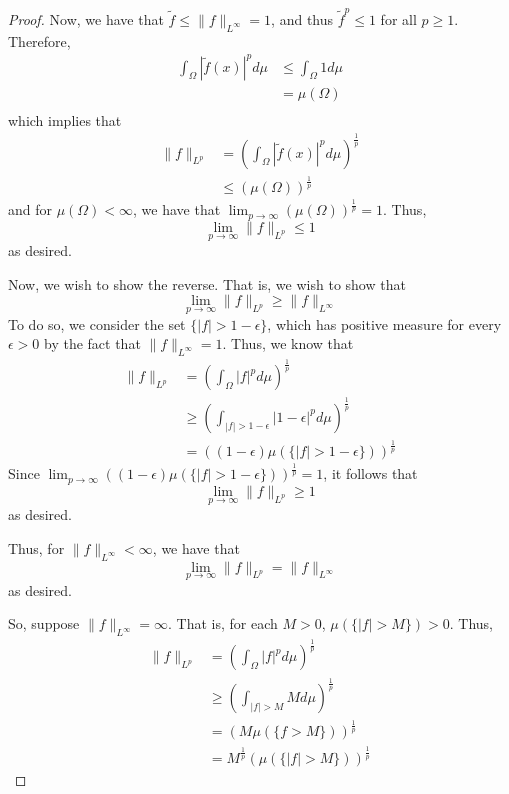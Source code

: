 \documentclass[fontsize=11pt]{scrartcl} %
\numberwithin{equation}{section} %
\numberwithin{figure}{section} %
\numberwithin{table}{section} %
\begin{document}
\begin{proof}
    Now, we have that $\tilde{f} \leq \|f\|_{L^{\infty}} = 1$, and thus
    $\tilde{f}^p\leq 1$ for all $p\geq 1$. Therefore,
    \[
        \begin{aligned}
            \int_{\Omega}|\tilde{f}(x)|^pd\mu &\leq \int_{\Omega}1d\mu\\
                                            &=\mu(\Omega)\\
        \end{aligned}
    \]
    which implies that
    \[
        \begin{aligned}
        \|f\|_{L^p} &=
        \left(\int_{\Omega}|\tilde{f}(x)|^pd\mu\right)^{\frac{1}{p}}\\
            &\leq (\mu(\Omega))^{\frac{1}{p}}
        \end{aligned}
    \]
    and for $\mu(\Omega)<\infty$, we have that
    $\lim_{p\to\infty}(\mu(\Omega))^{\frac{1}{p}} = 1$.
    Thus,
    \[
        \lim_{p\to\infty}\|f\|_{L^p} \leq 1
    \]
    as desired.

    Now, we wish to show the reverse. That is, we wish to show that
    \[
        \lim_{p\to\infty}\|f\|_{L^p} \geq \|f\|_{L^{\infty}}
    \]
    To do so, we consider the set $\{|f|>1-\epsilon\}$, which has positive
    measure for every $\epsilon>0$ by the fact that $\|f\|_{L^{\infty}} = 1$.
    Thus, we know that
    \[
        \begin{aligned}
            \|f\|_{L^p} &=\left(\int_{\Omega}|f|^pd\mu\right)^{\frac{1}{p}}\\
                        &\geq
                        \left(\int_{|f|>1-\epsilon}|1-\epsilon|^pd\mu\right)^{\frac{1}{p}}\\
                        &=((1-\epsilon)\mu(\{|f|>1-\epsilon\}))^{\frac{1}{p}}
        \end{aligned}
    \]
    Since $\lim_{p\to\infty}((1-\epsilon)\mu(\{|f|>1-\epsilon\}))^{\frac{1}{p}}
    = 1$, it follows that
    \[
        \lim_{p\to\infty}\|f\|_{L^p} \geq 1
    \]
    as desired.

    Thus, for $\|f\|_{L^{\infty}} < \infty$, we have that
    \[
        \lim_{p\to\infty}\|f\|_{L^p} = \|f\|_{L^{\infty}}
    \]
    as desired.

    So, suppose $\|f\|_{L^{\infty}} = \infty$. That is, for each $M>0$,
    $\mu(\{|f|>M\})>0$. Thus,
    \[
        \begin{aligned}
            \|f\|_{L^p} &= \left(\int_{\Omega}|f|^pd\mu\right)^{\frac{1}{p}}\\
                        &\geq \left(\int_{|f|>M}Md\mu\right)^{\frac{1}{p}}\\
                        &= \left(M\mu(\{f>M\})\right)^{\frac{1}{p}}\\
                        &= M^{\frac{1}{p}}(\mu(\{|f|>M\}))^{\frac{1}{p}}
        \end{aligned}
    \]
\end{proof}
\end{document}
